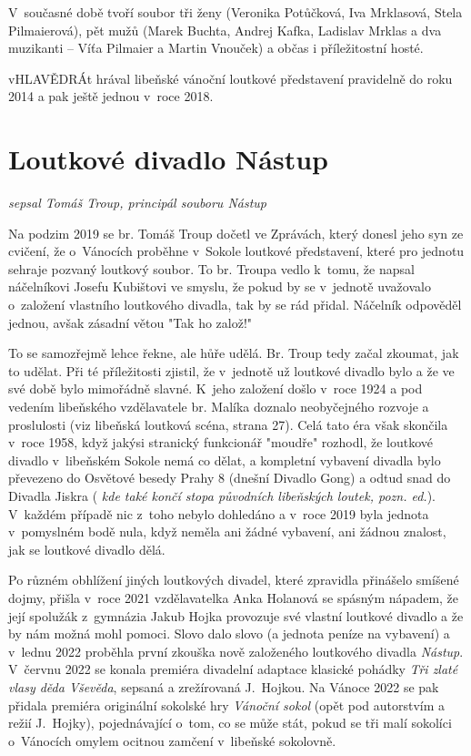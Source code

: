 \documentclass[a5paper, 11pt, twoside]{article}
\newcommand{\pozned}[1]{%
\textit{#1}}
\begin{document}
V~současné době tvoří soubor tři ženy (Veronika Potůčková, Iva
Mrklasová, Stela Pilmaierová), pět mužů (Marek Buchta, Andrej Kafka,
Ladislav Mrklas a dva muzikanti -- Víťa Pilmaier a Martin Vnouček) a
občas i příležitostní hosté.

vHLAVĚDRÁt hrával libeňské vánoční loutkové představení pravidelně do
roku 2014 a pak ještě jednou v~roce 2018.

\section{Loutkové divadlo Nástup}

\begin{center}
  \textit{sepsal Tomáš Troup, principál souboru Nástup}
\end{center}

\noindent
Na podzim 2019 se br. Tomáš Troup dočetl ve Zprávách, který donesl jeho
syn ze cvičení, že o~Vánocích proběhne v~Sokole loutkové představení,
které pro jednotu sehraje pozvaný loutkový soubor. To br. Troupa vedlo
k~tomu, že napsal náčelníkovi Josefu Kubištovi ve smyslu, že pokud by se
v~jednotě uvažovalo o~založení vlastního loutkového divadla, tak by se rád
přidal. Náčelník odpověděl jednou, avšak zásadní větou "Tak ho
založ!"

To se samozřejmě lehce řekne, ale hůře udělá. Br. Troup tedy začal
zkoumat, jak to udělat. Při té příležitosti zjistil, že v~jednotě už
loutkové divadlo bylo a že ve své době bylo mimořádně slavné. K~jeho
založení došlo v~roce 1924 a pod vedením libeňského vzdělavatele br.
Malíka doznalo neobyčejného rozvoje a proslulosti (viz libeňská loutková
scéna, strana 27). Celá tato éra však skončila
v~roce 1958, když jakýsi stranický funkcionář "moudře" rozhodl, že
loutkové divadlo v~libeňském Sokole nemá co dělat, a kompletní vybavení
divadla bylo převezeno do Osvětové besedy Prahy 8 (dnešní Divadlo Gong)
a odtud snad do Divadla Jiskra (\pozned{kde také končí stopa původních
libeňských loutek, pozn. ed.}). V~každém případě nic z~toho nebylo
dohledáno a v~roce 2019 byla jednota v~pomyslném bodě nula, když neměla
ani žádné vybavení, ani žádnou znalost, jak se loutkové divadlo dělá.

Po různém obhlížení jiných loutkových divadel, které zpravidla přinášelo
smíšené dojmy, přišla v~roce 2021 vzdělavatelka Anka Holanová se spásným
nápadem, že její spolužák z~gymnázia Jakub Hojka provozuje své vlastní
loutkové divadlo a že by nám možná mohl pomoci. Slovo dalo slovo (a
jednota peníze na vybavení) a v~lednu 2022 proběhla první zkouška nově
založeného loutkového divadla \textit{Nástup}. V~červnu 2022 se konala
premiéra divadelní adaptace klasické pohádky \textit{Tři zlaté vlasy děda
Vševěda}, sepsaná a zrežírovaná J.~Hojkou. Na Vánoce 2022 se pak přidala
premiéra originální sokolské hry \textit{Vánoční sokol} (opět pod
autorstvím a režií J.~Hojky), pojednávající o~tom, co se může stát,
pokud se tři malí sokolíci o~Vánocích omylem ocitnou zamčení v~libeňské
sokolovně.
\end{document}

